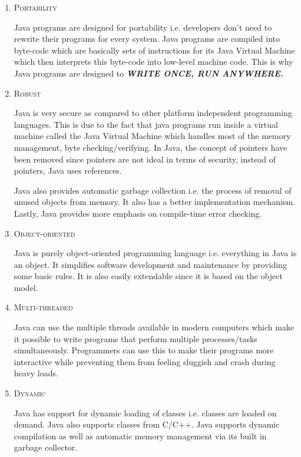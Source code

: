 \documentclass[a4paper, 12pt]{scrarticle}
\begin{document}
\begin{enumerate}
  \item \textsc{Portability}

    Java programs are designed for portability i.e. developers don't need to rewrite their programs for every system. Java programs are compiled into byte-code which are basically sets of instructions for its Java Virtual Machine which then interprets this byte-code into low-level machine
    code. This is why Java programs are designed to \textit{\bfseries WRITE ONCE, RUN ANYWHERE.}

  \item \textsc{Robust}

    Java is very secure as compared to other platform independent programming languages. This is due to the fact that java programs run inside a virtual machine called the Java Virtual Machine which handles most of the memory management, byte checking/verifying. In Java, the concept of
    pointers have been removed since pointers are not ideal in terms of security, instead of pointers, Java uses references.

    Java also provides automatic garbage collection i.e. the process of removal of unused objects from memory. It also has a better implementation mechanism. Lastly, Java provides more emphasis on compile-time error checking.

  \item \textsc{Object-oriented}

    Java is purely object-oriented programming language i.e. everything in Java is an object. It simplifies software development and maintenance by providing some basic rules. It is also easily extendable since it is based on the object model.

  \item \textsc{Multi-threaded}

    Java can use the multiple threads available in modern computers which make it possible to write programs that perform multiple processes/tasks simultaneously. Programmers can use this to make their programs more interactive while preventing them from feeling sluggish and crash during
    heavy loads.

  \item \textsc{Dynamic}

    Java has support for dynamic loading of classes i.e. classes are loaded on demand. Java also supports classes from C/C++. Java supports dynamic compilation as well as automatic memory management via its built in garbage collector.
\end{enumerate}
\end{document}
